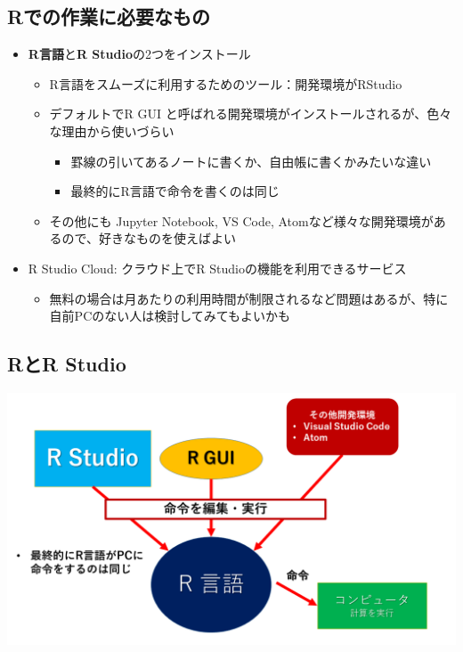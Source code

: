 \documentclass[
]{ltjsarticle}
\providecommand{\tightlist}{%
  \setlength{\itemsep}{0pt}\setlength{\parskip}{0pt}}
\begin{document}
\hypertarget{rux3067ux306eux4f5cux696dux306bux5fc5ux8981ux306aux3082ux306e}{%
\subsection{Rでの作業に必要なもの}\label{rux3067ux306eux4f5cux696dux306bux5fc5ux8981ux306aux3082ux306e}}

\begin{itemize}
\tightlist
\item
  \textbf{R言語}と\textbf{R Studio}の2つをインストール

  \begin{itemize}
  \tightlist
  \item
    R言語をスムーズに利用するためのツール：開発環境がRStudio
  \item
    デフォルトでR GUI
    と呼ばれる開発環境がインストールされるが、色々な理由から使いづらい

    \begin{itemize}
    \tightlist
    \item
      罫線の引いてあるノートに書くか、自由帳に書くかみたいな違い
    \item
      最終的にR言語で命令を書くのは同じ
    \end{itemize}
  \item
    その他にも Jupyter Notebook, VS Code,
    Atomなど様々な開発環境があるので、好きなものを使えばよい
  \end{itemize}
\item
  R Studio Cloud: クラウド上でR Studioの機能を利用できるサービス

  \begin{itemize}
  \tightlist
  \item
    無料の場合は月あたりの利用時間が制限されるなど問題はあるが、特に自前PCのない人は検討してみてもよいかも
  \end{itemize}
\end{itemize}

\hypertarget{rux3068r-studio}{%
\subsection{RとR Studio}\label{rux3068r-studio}}

\begin{center}\includegraphics[width=0.95\linewidth]{figs/r_structure} \end{center}
\end{document}
